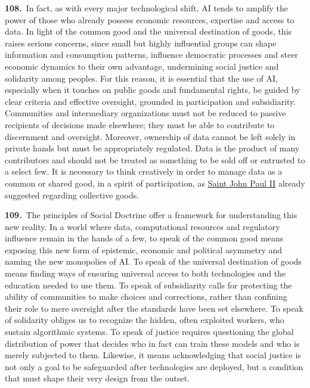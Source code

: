 \documentclass{article}
\begin{document}
\textbf{108.}\ In fact, as with every major technological shift, AI tends to amplify the power of those who already possess economic resources, expertise and access to data. In light of the common good and the universal destination of goods, this raises serious concerns, since small but highly influential groups can shape information and consumption patterns, influence democratic processes and steer economic dynamics to their own advantage, undermining social justice and solidarity among peoples. For this reason, it is essential that the use of AI, especially when it touches on public goods and fundamental rights, be guided by clear criteria and effective oversight, grounded in participation and subsidiarity. Communities and intermediary organizations must not be reduced to passive recipients of decisions made elsewhere; they must be able to contribute to discernment and oversight. Moreover, ownership of data cannot be left solely in private hands but must be appropriately regulated. Data is the product of many contributors and should not be treated as something to be sold off or entrusted to a select few. It is necessary to think creatively in order to manage data as a common or shared good, in a spirit of participation, as \href{https://www.vatican.va/content/john-paul-ii/en.html}{Saint John Paul II} already suggested regarding collective goods.\cite{n128}

\textbf{109.}\ The principles of Social Doctrine offer a framework for understanding this new reality. In a world where data, computational resources and regulatory influence remain in the hands of a few, to speak of the common good means exposing this new form of epistemic, economic and political asymmetry and naming the new monopolies of AI. To speak of the universal destination of goods means finding ways of ensuring universal access to both technologies and the education needed to use them. To speak of subsidiarity calls for protecting the ability of communities to make choices and corrections, rather than confining their role to mere oversight after the standards have been set elsewhere. To speak of solidarity obliges us to recognize the hidden, often exploited workers, who sustain algorithmic systems. To speak of justice requires questioning the global distribution of power that decides who in fact can train these models and who is merely subjected to them. Likewise, it means acknowledging that social justice is not only a goal to be safeguarded after technologies are deployed, but a condition that must shape their very design from the outset.
\end{document}
